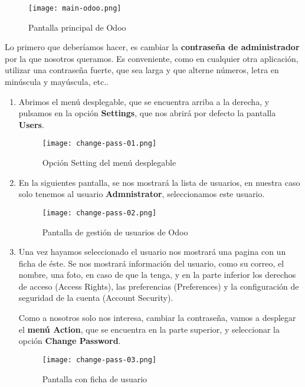 \begin{figure}[ht]
    \centering
    \texttt{[image: main-odoo.png]}
    \caption{Pantalla principal de Odoo}
\end{figure}

Lo primero que deberíamos hacer, es cambiar la \textbf{contraseña de administrador} por la que nosotros queramos. Es conveniente, como en cualquier otra aplicación, utilizar una contraseña fuerte, que sea larga y que alterne números, letra en minúscula y mayúscula, etc..

\begin{enumerate}
    \item Abrimos el menú desplegable, que se encuentra arriba a la derecha, y pulsamos en la opción \textbf{Settings}, que nos abrirá por defecto la pantalla \textbf{Users}.

    \begin{figure}[ht]
        \centering
        \texttt{[image: change-pass-01.png]}
        \caption{Opción Setting del menú desplegable}
    \end{figure}

    \item En la siguientes pantalla, se nos mostrará la lista de usuarios, en nuestra caso solo tenemos al usuario \textbf{Admnistrator}, seleccionamos este usuario.

    \begin{figure}[ht]
        \centering
        \texttt{[image: change-pass-02.png]}
        \caption{Pantalla de gestión de usuarios de Odoo}
        \label{fig:user}
    \end{figure}

    \item Una vez hayamos seleccionado el usuario nos mostrará una pagina con un ficha de éste. Se nos mostrará información del usuario, como su correo, el nombre, una foto, en caso de que la tenga, y en la parte inferior los derechos de acceso (Access Rights), las preferencias (Preferences) y la configuración de seguridad de la cuenta (Account Security).

    Como a nosotros solo nos interesa, cambiar la contraseña, vamos a desplegar el \textbf{menú Action}, que se encuentra en la parte superior, y seleccionar la opción \textbf{Change Password}.

    \vspace{8ex}

    \begin{figure}[ht]
        \centering
        \texttt{[image: change-pass-03.png]}
        \caption{Pantalla con ficha de usuario}
    \end{figure}


\end{enumerate}
